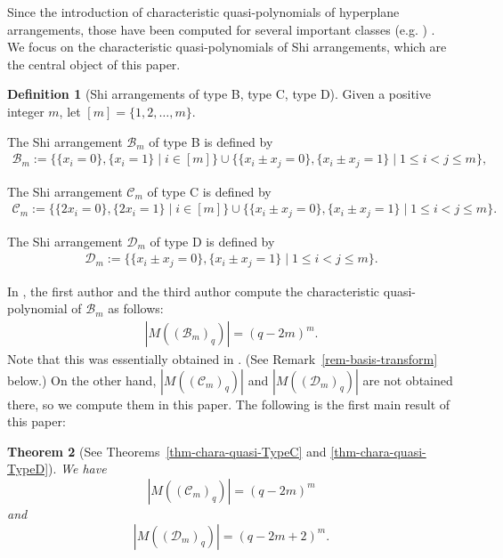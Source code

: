 \documentclass{article}
\theoremstyle{plain}
\newtheorem{Them}{Theorem}[section]
\theoremstyle{definition}
\newtheorem{Defi}[Them]{Definition}
\theoremstyle{remark}
\numberwithin{equation}{section}
\newcommand{\Bc}{\mathcal{B}}
\newcommand{\Cc}{\mathcal{C}}
\newcommand{\Dc}{\mathcal{D}}
\begin{document}
Since the introduction of characteristic quasi-polynomials of hyperplane arrangements, those have been computed for several important classes (e.g. \cite{MN2024, Yoshinaga2018}) . 
We focus on the characteristic quasi-polynomials of Shi arrangements, which are the central object of this paper. 
\begin{Defi}[Shi arrangements of type B, type C, type D]
Given a positive integer $m$, let $[m]=\{1,2,\ldots,m\}$. 

The Shi arrangement $\mathcal{B}_m$ of type B is defined by
\begin{align*}
\mathcal{B}_m:=\{\{x_i=0\},\{x_i=1\}\mid i\in [m]\}\cup\{\{x_i\pm x_j=0\},\{x_i\pm x_j=1\}\mid 1\leq i<j\leq m\}, 
\end{align*}

The Shi arrangement $\mathcal{C}_m$ of type C is defined by
\begin{align*}
\mathcal{C}_m:=\{\{2x_i=0\},\{2x_i=1\}\mid i\in [m]\}\cup\{\{x_i\pm x_j=0\},\{x_i\pm x_j=1\}\mid 1\leq i<j\leq m\}.
\end{align*}

The Shi arrangement $\Dc_m$ of type D is defined by
\begin{align*}
\Dc_m:=\{\{x_i\pm x_j=0\},\{x_i\pm x_j=1\}\mid 1\leq i<j\leq m\}.
\end{align*}
\end{Defi}

\medskip

In \cite{HN2024}, the first author and the third author compute the characteristic quasi-polynomial of $\Bc_m$ as follows: 
\begin{align}\label{eq:typeB_Shi}
\left| M((\Bc_m)_q)\right| = (q-2m)^m. 
\end{align}
Note that this was essentially obtained in \cite[Theorem 5.1]{Yoshinaga2018}. (See Remark~\ref{rem-basis-transform} below.) 
On the other hand, $\left| M((\Cc_m)_q)\right|$ and $\left| M((\Dc_m)_q)\right|$ are not obtained there, so we compute them in this paper. 
The following is the first main result of this paper: 
\begin{Them}[See Theorems~\ref{thm-chara-quasi-TypeC} and \ref{thm-chara-quasi-TypeD}]\label{thm:Shi} We have 
\begin{equation}\label{eq:typeC_Shi} 
    |M((\Cc_m)_q)|=(q-2m)^m 
\end{equation}
and 
\begin{equation}\label{eq:typeD_Shi}
    |M((\Dc_m)_q)|=(q-2m+2)^m. 
\end{equation}
\end{Them}
\end{document}
